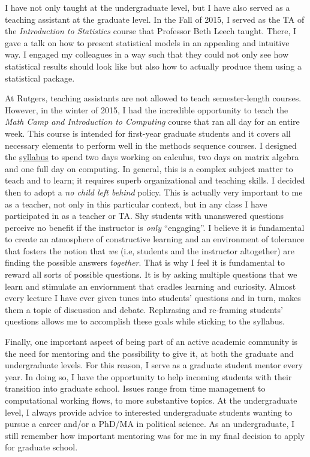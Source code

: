 \documentclass[11pt]{letter} %
\begin{document}
\begin{letter}{}
I have not only taught at the undergraduate level, but I have also served as a teaching assistant at the graduate level. In the Fall of 2015, I served as the TA of the \emph{Introduction to Statistics} course that Professor Beth Leech taught. There, I gave a talk on how to present statistical models in an appealing and intuitive way. I engaged my colleagues in a way such that they could not only see how statistical results should look like but also how to actually produce them using a statistical package. 

At Rutgers, teaching assistants are not allowed to teach semester-length courses. However, in the winter of 2015, I had the incredible opportunity to teach the \emph{Math Camp and Introduction to Computing} course that ran all day for an entire week. This course is intended for first-year graduate students and it covers all necessary elements to perform well in the methods sequence courses. I designed the \href{https://github.com/hbahamonde/Math-Camp/raw/master/Syllabus/Math_Camp_Syllabus.pdf}{syllabus} to spend two days working on calculus, two days on matrix algebra and one full day on computing. In general, this is a complex subject matter to teach and to learn; it requires superb organizational and teaching skills. I decided then to adopt a \emph{no child left behind} policy. This is actually very important to me as a teacher, not only in this particular context, but in any class I have participated in as a teacher or TA. Shy students with unanswered questions perceive no benefit if the instructor is \emph{only} ``engaging''. I believe it is fundamental to create an atmosphere of constructive learning and an environment of tolerance that fosters the notion that \emph{we} (i.e, students and the instructor altogether) are finding the possible answers \emph{together}. That is why I feel it is fundamental to reward all sorts of possible questions. It is by asking multiple questions that we learn and stimulate an enviornment that cradles learning and curiosity. Almost every lecture I have ever given tunes into students' questions and in turn, makes them a topic of discussion and debate. Rephrasing and re-framing students' questions allows me to accomplish these goals while sticking to the syllabus. 

Finally, one important aspect of being part of an active academic community is the need for mentoring and the possibility to give it, at both the graduate and undergraduate levels. For this reason, I serve as a graduate student mentor every year. In doing so, I have the opportunity to help incoming students with their transition into graduate school. Issues range from time management to computational working flows, to more substantive topics. At the undergraduate level, I always provide advice to interested undergraduate students wanting to pursue a career and/or a PhD/MA in political science. As an undergraduate, I still remember how important mentoring was for me in my final decision to apply for graduate school.


\end{letter}
\end{document}

